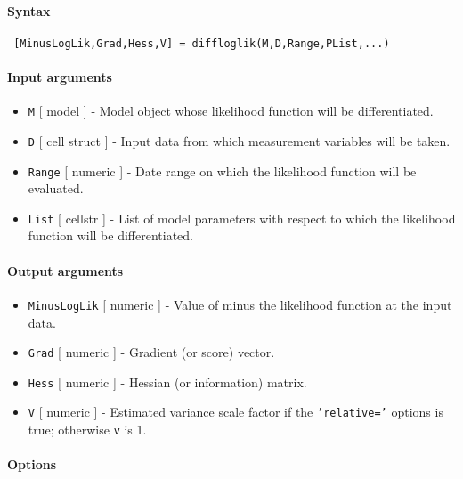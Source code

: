 


	\paragraph{Syntax}
 
 \begin{verbatim}
 [MinusLogLik,Grad,Hess,V] = diffloglik(M,D,Range,PList,...)
 \end{verbatim}
 
 \paragraph{Input arguments}
 
 \begin{itemize}
 \item
   \texttt{M} {[} model {]} - Model object whose likelihood function will
   be differentiated.
 \item
   \texttt{D} {[} cell \textbar{} struct {]} - Input data from which
   measurement variables will be taken.
 \item
   \texttt{Range} {[} numeric {]} - Date range on which the likelihood
   function will be evaluated.
 \item
   \texttt{List} {[} cellstr {]} - List of model parameters with respect
   to which the likelihood function will be differentiated.
 \end{itemize}
 
 \paragraph{Output arguments}
 
 \begin{itemize}
 \item
   \texttt{MinusLogLik} {[} numeric {]} - Value of minus the likelihood
   function at the input data.
 \item
   \texttt{Grad} {[} numeric {]} - Gradient (or score) vector.
 \item
   \texttt{Hess} {[} numeric {]} - Hessian (or information) matrix.
 \item
   \texttt{V} {[} numeric {]} - Estimated variance scale factor if the
   \texttt{'relative='} options is true; otherwise \texttt{v} is 1.
 \end{itemize}
 
 \paragraph{Options}
 
